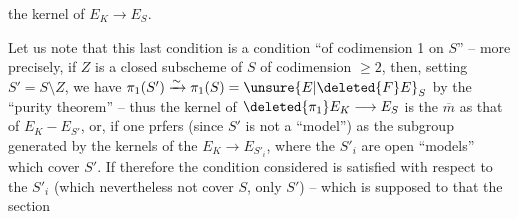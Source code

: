 the kernel of $E_K\longrightarrow E_S$.

Let us note that this last condition is a condition ``of codimension 1 on $S$'' -- more precisely, if $Z$ is a closed subscheme of $S$ of codimension $\geq 2$,  then, setting $S'=S\setminus Z$, we have $\pi_1(S')\xrightarrow{\sim}\pi_1(S)=\unsure{E|\deleted{F}E}_S$ by the ``purity theorem'' -- thus the kernel of $\deleted{\pi_1}E_K\longrightarrow E_S$ is the $\overline{m}$ as that of $E_K-E_{S'}$, or, if one prfers (since $S'$ is not a ``model'') as the  subgroup generated by the kernels of the $E_K\longrightarrow E_{S'_i}$, where the $S'_i$ are open ``models'' which cover $S'$. If therefore the condition considered is satisfied with respect to the $S'_i$ (which nevertheless   not cover $S$, only $S'$) -- which is supposed to  that the section
